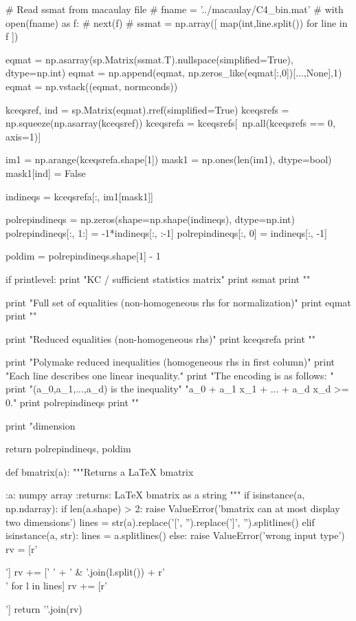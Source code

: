 \begin{python}
    # Read ssmat from macaulay file
    # fname = '../macaulay/C4_bin.mat'
    # with open(fname) as f:
    #     next(f)
    #     ssmat = np.array([ map(int,line.split()) for line in f ])

    eqmat = np.asarray(sp.Matrix(ssmat.T).nullspace(simplified=True),
                       dtype=np.int)
    eqmat = np.append(eqmat, np.zeros_like(eqmat[:,0])[...,None],1)
    eqmat = np.vstack((eqmat, normconds))

    kceqsref, ind = sp.Matrix(eqmat).rref(simplified=True)
    kceqsrefs = np.squeeze(np.asarray(kceqsref))
    kceqsrefa = kceqsrefs[~np.all(kceqsrefs == 0, axis=1)]

    im1 = np.arange(kceqsrefa.shape[1])
    mask1 = np.ones(len(im1), dtype=bool)
    mask1[ind] = False

    indineqs = kceqsrefa[:, im1[mask1]]

    polrepindineqs = np.zeros(shape=np.shape(indineqs), dtype=np.int)
    polrepindineqs[:, 1:] = -1*indineqs[:, :-1]
    polrepindineqs[:, 0] = indineqs[:, -1]

    poldim = polrepindineqs.shape[1] - 1

    if printlevel:
        print "KC / sufficient statistics matrix"
        print ssmat
        print ""

        print "Full set of equalities (non-homogeneous rhs for normalization)"
        print eqmat
        print ""

        print "Reduced equalities (non-homogeneous rhs)"
        print kceqsrefa
        print ""

        print "Polymake reduced inequalities (homogeneous rhs in first column)"
        print "Each line describes one linear inequality."
        print "The encoding is as follows: "
        print "(a_0,a_1,...,a_d) is the inequality"
              "a_0 + a_1 x_1 + ... + a_d x_d >= 0."
        print polrepindineqs
        print ""

        print "dimension %

    return polrepindineqs, poldim

def bmatrix(a):
    """Returns a LaTeX bmatrix

    :a: numpy array
    :returns: LaTeX bmatrix as a string
    """
    if isinstance(a, np.ndarray):
        if len(a.shape) > 2:
            raise ValueError('bmatrix can at most display two dimensions')
        lines = str(a).replace('[', '').replace(']', '').splitlines()
    elif isinstance(a, str):
        lines = a.splitlines()
    else:
        raise ValueError('wrong input type')
    rv = [r'\begin{bmatrix}']
    rv += ['  ' + ' & '.join(l.split()) + r'\\' for l in lines]
    rv +=  [r'\end{bmatrix}']
    return '\n'.join(rv)


\end{python}
